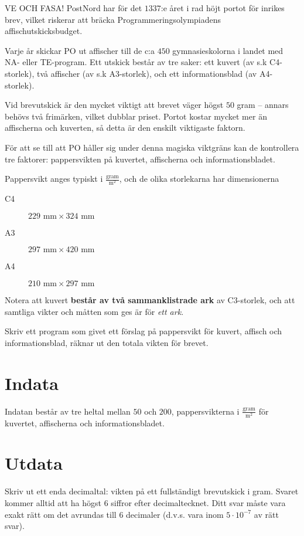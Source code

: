 VE OCH FASA!
PostNord har för det $1337$:e året i rad höjt portot för inrikes brev, vilket riskerar att bräcka Programmeringsolympiadens affischutskicksbudget.

Varje år skickar PO ut affischer till de c:a $450$ gymnasieskolorna i landet med NA- eller TE-program.
Ett utskick består av tre saker: ett kuvert (av s.k C4-storlek), två affischer (av s.k A3-storlek), och ett informationsblad (av A4-storlek).

Vid brevutskick är den mycket viktigt att brevet väger högst $50$ gram -- annars behövs två frimärken, vilket dubblar priset.
Portot kostar mycket mer än affischerna och kuverten, så detta är den enskilt viktigaste faktorn.

För att se till att PO håller sig under denna magiska viktgräns kan de kontrollera tre faktorer: pappersvikten på kuvertet, affischerna och informationsbladet.

Pappersvikt anges typiskt i $\frac{\text{gram}}{\text{m}^2}$, och de olika storlekarna har dimensionerna 
\begin{description}
\item[C4] $229\text{ mm} \times 324\text{ mm}$
\item[A3] $297\text{ mm} \times 420\text{ mm}$
\item[A4] $210\text{ mm} \times 297\text{ mm}$
\end{description}
Notera att kuvert \textbf{består av två sammanklistrade ark} av C3-storlek, och att samtliga vikter och måtten som ges är för \emph{ett ark}.

Skriv ett program som givet ett förslag på pappersvikt för kuvert, affisch och informationsblad, räknar ut den totala vikten för brevet.

\section*{Indata}
Indatan består av tre heltal mellan $50$ och $200$, pappersvikterna i $\frac{\text{gram}}{\text{m}^2}$ för kuvertet, affischerna och informationsbladet.

\section*{Utdata}
Skriv ut ett enda decimaltal: vikten på ett fullständigt brevutskick i gram.
Svaret kommer alltid att ha högst $6$ siffror efter decimaltecknet.
Ditt svar måste vara exakt rätt om det avrundas till $6$ decimaler (d.v.s. vara inom $5 \cdot 10^{-7}$ av rätt svar).
